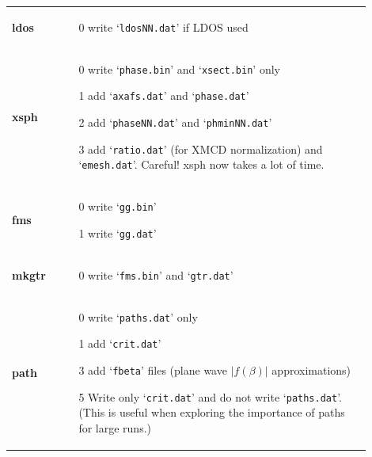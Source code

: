 \documentclass[11pt,oneside]{report} %
\newcommand{\file}[1]{`\texttt{#1}'}
\newcommand{\module}[1]{\textrm{\bf{#1}}}
\begin{document}
\begin{latexonly}
\begin{table}[htbp]
\begin{center}
\begin{tabular}[h]{p{0.1\linewidth}p{0.8\linewidth}}
      \module{ldos} &
      \vspace{-4ex}
      \begin{itemize}
        \tightlist
      \item[0] write \file{ldosNN.dat} if LDOS used
      \end{itemize}\\
      \module{xsph} &
      \vspace{-4ex}
      \begin{itemize}
        \tightlist
      \item[0] write \file{phase.bin} and \file{xsect.bin} only
      \item[1] add \file{axafs.dat} and \file{phase.dat}
      \item[2] add \file{phaseNN.dat} and \file{phminNN.dat}
      \item[3] add \file{ratio.dat} (for XMCD normalization) and \file{emesh.dat}.  Careful!  xsph now takes a lot of time.
      \end{itemize} \\
      \module{fms} &
      \vspace{-4ex}
      \begin{itemize}
        \tightlist
      \item[0] write \file{gg.bin}
      \item[1] write \file{gg.dat}
      \end{itemize}\\
      \module{mkgtr} &
      \vspace{-4ex}
      \begin{itemize}
        \tightlist
      \item[0] write \file{fms.bin} and \file{gtr.dat}
      \end{itemize}\\
      \module{path} &
      \vspace{-4ex}
      \begin{itemize}
        \tightlist
      \item[0] write \file{paths.dat} only
      \item[1] add \file{crit.dat}
      \item[3] add \file{fbeta} files (plane wave $|f(\beta)|$ approximations)
      \item[5] Write only \file{crit.dat} and do not write \file{paths.dat}.
        (This is useful when exploring the importance of paths for large runs.)
      \end{itemize}\\

\end{tabular}
\end{center}
\end{table}
\end{latexonly}
\end{document}

